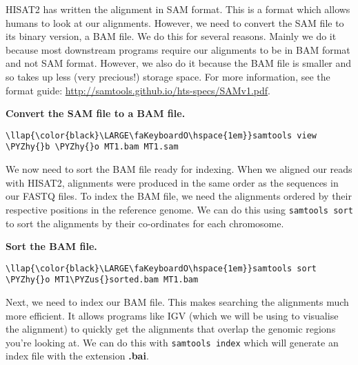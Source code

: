 \documentclass[11pt]{article}
\def\PYZus{\char`\_}
\def\PYZhy{\char`\-}
\begin{document}
    HISAT2 has written the alignment in SAM format. This is a format which
allows humans to look at our alignments. However, we need to convert the
SAM file to its binary version, a BAM file. We do this for several
reasons. Mainly we do it because most downstream programs require our
alignments to be in BAM format and not SAM format. However, we also do
it because the BAM file is smaller and so takes up less (very precious!)
storage space. For more information, see the format guide:
\url{http://samtools.github.io/hts-specs/SAMv1.pdf}.

    \textbf{Convert the SAM file to a BAM file.}





\begin{terminalinput}
\begin{Verbatim}[commandchars=\\\{\}]
\llap{\color{black}\LARGE\faKeyboardO\hspace{1em}}samtools view \PYZhy{}b \PYZhy{}o MT1.bam MT1.sam
\end{Verbatim}
\end{terminalinput}



    We now need to sort the BAM file ready for indexing. When we aligned our
reads with HISAT2, alignments were produced in the same order as the
sequences in our FASTQ files. To index the BAM file, we need the
alignments ordered by their respective positions in the reference
genome. We can do this using \texttt{samtools\ sort} to sort the
alignments by their co-ordinates for each chromosome.

    \textbf{Sort the BAM file.}





\begin{terminalinput}
\begin{Verbatim}[commandchars=\\\{\}]
\llap{\color{black}\LARGE\faKeyboardO\hspace{1em}}samtools sort \PYZhy{}o MT1\PYZus{}sorted.bam MT1.bam
\end{Verbatim}
\end{terminalinput}



    Next, we need to index our BAM file. This makes searching the alignments
much more efficient. It allows programs like IGV (which we will be using
to visualise the alignment) to quickly get the alignments that overlap
the genomic regions you're looking at. We can do this with
\texttt{samtools\ index} which will generate an index file with the
extension \textbf{.bai}.
\end{document}
